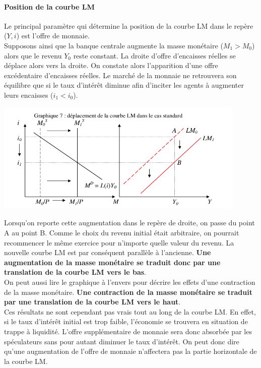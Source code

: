 \documentclass[10pt]{book}
\begin{document}
\paragraph{Position de la courbe LM}
Le principal paramètre qui détermine la position de la courbe LM dans le repère ($Y,i$) est l'offre de monnaie. \\
Supposons ainsi que la banque centrale augmente la masse monétaire ($M_1 > M_0$) alors que le revenu $Y_0$ reste constant. La droite d'offre d'encaisses réelles se déplace alors vers la droite. On constate alors l'apparition d'une offre excédentaire d'encaisses réelles. Le marché de la monnaie ne retrouvera son équilibre que si le taux d'intérêt diminue afin d'inciter les agents à augmenter leurs encaisses ($i_1 < i_0$).
\begin{center}
  \includegraphics[width=12cm]{graph31.png}
\end{center}
Lorsqu'on reporte cette augmentation dans le repère de droite, on passe du point A au point B. Comme le choix du revenu initial était arbitraire, on pourrait recommencer le même exercice pour n'importe quelle valeur du revenu. La nouvelle courbe LM est par conséquent parallèle à l'ancienne. \textbf{Une augmentation de la masse monétaire se traduit donc par une translation de la courbe LM vers le bas}. \\
On peut aussi lire le graphique à l'envers pour décrire les effets d'une contraction de la masse monétaire. \textbf{Une contraction de la masse monétaire se traduit par une translation de la courbe LM vers le haut}. \\
Ces résultats ne sont cependant pas vrais tout au long de la courbe LM. En effet, si le taux d'intérêt initial est trop faible, l'économie se trouvera en situation de trappe à liquidité. L'offre supplémentaire de monnaie sera donc absorbée par les spéculateurs sans pour autant diminuer le taux d'intérêt. On peut donc dire qu'une augmentation de l'offre de monnaie n'affectera pas la partie horizontale de la courbe LM.
\end{document}
